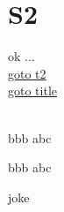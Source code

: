 \documentclass{beamer}
\begin{document}
\section{S2}
\begin{frame}
ok ... \\
\hyperlink{t2}{goto t2} \\
\hyperlink{title}{goto title} \\
\hyperlink{title}{} \\
\begin{block}{bbb}
abc
\end{block}
\begin{alertblock}{bbb}
abc
\end{alertblock}
\end{frame}


\begin{frame} {joke}
\end{frame}
\end{document}
